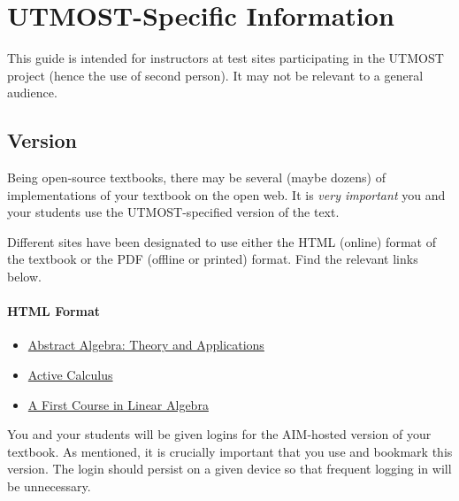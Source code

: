 \documentclass[10pt,]{article}
\begin{document}
\section[{UTMOST-Specific Information}]{UTMOST-Specific Information}\label{section-utmost-specifics}
\hypertarget{p-35}{}%
This guide is intended for instructors at test sites participating in the UTMOST project (hence the use of second person). It may not be relevant to a general audience.%
\typeout{************************************************}
\typeout{************************************************}
\subsection[{Version}]{Version}\label{subsection-version}
\hypertarget{p-36}{}%
Being open-source textbooks, there may be several (maybe dozens) of implementations of your textbook on the open web. It is \emph{very important} you and your students use the UTMOST-specified version of the text.%
\par
\hypertarget{p-37}{}%
Different sites have been designated to use either the HTML (online) format of the textbook or the PDF (offline or printed) format. Find the relevant links below.%
\typeout{************************************************}
\typeout{************************************************}
\paragraph[{HTML Format}]{HTML Format}\hypertarget{paragraphs-17}{}
\hypertarget{p-38}{}%
\leavevmode%
\begin{itemize}[label=\textbullet]
\item{}\href{https://books.aimath.org/aata/}{Abstract Algebra: Theory and Applications}%
\item{}\href{https://books.aimath.org/ac/}{Active Calculus}%
\item{}\href{https://books.aimath.org/fcla/}{A First Course in Linear Algebra}%
\end{itemize}
%
\par
\hypertarget{p-39}{}%
You and your students will be given logins for the AIM-hosted version of your textbook. As mentioned, it is crucially important that you use and bookmark this version. The login should persist on a given device so that frequent logging in will be unnecessary.%
\typeout{************************************************}
\typeout{************************************************}
\end{document}
